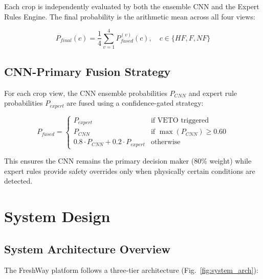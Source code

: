 \documentclass[conference]{IEEEtran}
\begin{document}
Each crop is independently evaluated by both the ensemble CNN and the Expert Rules Engine. The final probability is the arithmetic mean across all four views:

\begin{equation}
P_{final}(c) = \frac{1}{4} \sum_{v=1}^{4} P_{fused}^{(v)}(c), \quad c \in \{HF, F, NF\}
\end{equation}

\subsection{CNN-Primary Fusion Strategy}

For each crop view, the CNN ensemble probabilities $P_{CNN}$ and expert rule probabilities $P_{expert}$ are fused using a confidence-gated strategy:

\begin{equation}
P_{fused} = 
\begin{cases}
P_{expert} & \text{if VETO triggered} \\
P_{CNN} & \text{if } \max(P_{CNN}) \geq 0.60 \\
0.8 \cdot P_{CNN} + 0.2 \cdot P_{expert} & \text{otherwise}
\end{cases}
\end{equation}

This ensures the CNN remains the primary decision maker (80\% weight) while expert rules provide safety overrides only when physically certain conditions are detected.

\section{System Design}

\subsection{System Architecture Overview}

The FreshWay platform follows a three-tier architecture (Fig.~\ref{fig:system_arch}):
\end{document}
